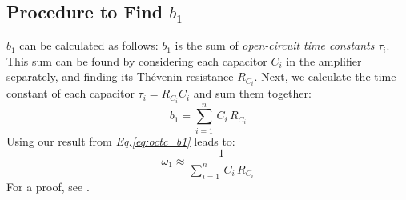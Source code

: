\subsection{Procedure to Find \texorpdfstring{$b_1$}{the Dominant Pole}}
$b_1$ can be calculated as follows:  $b_1$ is the sum of \textit{open-circuit time constants} $\tau_i$.  This sum can be found by considering each capacitor $C_i$ in the amplifier separately, and finding its Thévenin resistance $R_{C_i}$.  Next, we calculate the time-constant of each capacitor $\tau_i = R_{C_i} C_i$ and sum them together:
    \begin{equation}
        b_1 = \sum_{i=1}^n\,C_i\,R_{C_i} 
    \end{equation}
Using our result from \emph{Eq.\ref{eq:octc_b1}} leads to:
    \begin{equation}
        \omega_1 \approx \frac{1}{\sum_{i=1}^n\,C_i\,R_{C_i}}
    \end{equation}
For a proof, see \cite{GrayMeyer}.
